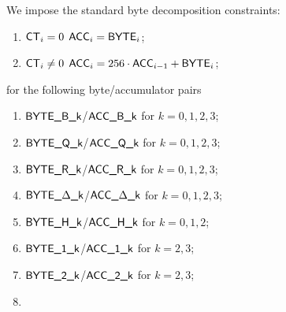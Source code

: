 \noindent We impose the standard byte decomposition constraints:
\begin{enumerate}
	\item \If $\textsf{CT}_{i} = 0$ \Then $\textsf{ACC}_{i} = \textsf{BYTE}_{i}$;
	\item \If $\textsf{CT}_{i} \neq 0$ \Then $\textsf{ACC}_{i} = 256 \cdot \textsf{ACC}_{i - 1} + \textsf{BYTE}_{i}$;
\end{enumerate}
for the following byte/accumulator pairs
\begin{multicols}{2}
\begin{enumerate}
	\item $\textsf{BYTE}\textsf{\_B\_k}$/$\textsf{ACC}\textsf{\_B\_k}$ for $k=0,1,2,3$;
	\item $\textsf{BYTE}\textsf{\_Q\_k}$/$\textsf{ACC}\textsf{\_Q\_k}$ for $k=0,1,2,3$;
	\item $\textsf{BYTE}\textsf{\_R\_k}$/$\textsf{ACC}\textsf{\_R\_k}$ for $k=0,1,2,3$;
	\item $\textsf{BYTE}\textsf{\_$\Delta$\_k}$/$\textsf{ACC}\textsf{\_$\Delta$\_k}$ for $k=0,1,2,3$;
	\item $\textsf{BYTE}\textsf{\_H\_k}$/$\textsf{ACC}\textsf{\_H\_k}$ for $k=0,1,2$;
	\item $\textsf{BYTE}\textsf{\_1\_k}$/$\textsf{ACC}\textsf{\_1\_k}$ for $k=2,3$;
	\item $\textsf{BYTE}\textsf{\_2\_k}$/$\textsf{ACC}\textsf{\_2\_k}$ for $k=2,3$;
	\item[\vspace{\fill}]
\end{enumerate}
\end{multicols}
